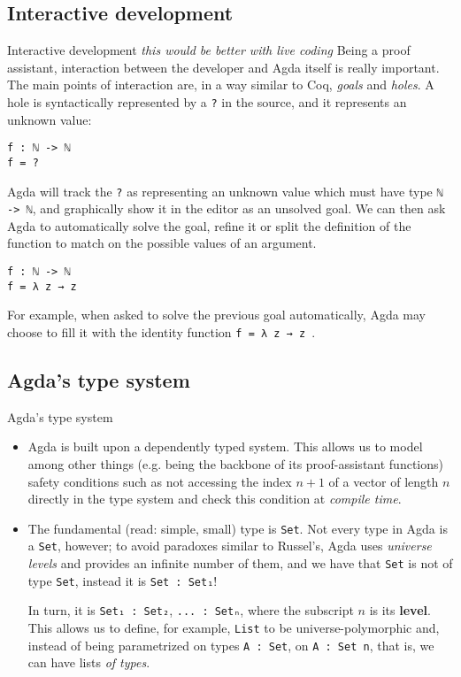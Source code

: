 \documentclass[t,aspectratio=169,9pt]{beamer}
\begin{document}
\subsection[inter-dev]{Interactive development}
\begin{frame}[fragile]{Interactive development}
{\small \it this would be better with live coding}
\vfill
Being a proof assistant, interaction between the developer and Agda itself is
really important. The main points of interaction are, in a way similar to Coq,
\textit{goals} and \textit{holes}. A hole is syntactically represented by a
\texttt{?} in the source, and it represents an unknown value:
\begin{verbatim}
f : ℕ -> ℕ
f = ?
\end{verbatim}
Agda will track the \texttt{?} as representing an unknown value which must have type
\texttt{ℕ -> ℕ}, and graphically show it in the editor as an unsolved
goal. We can then ask Agda to automatically solve the goal, refine it or split
the definition of the function to match on the possible values of an argument.
\begin{verbatim}
f : ℕ -> ℕ
f = λ z → z
\end{verbatim}
For example, when asked to solve the previous goal automatically, Agda may
choose to fill it with the identity function \texttt{f = λ z → z }.
\vfill
\end{frame}
\subsection[types]{Agda's type system}
\begin{frame}[fragile]{Agda's type system}
  \vfill
  \begin{itemize}
  \item {
      Agda is built upon a dependently typed system. This allows us to model
      among other things (e.g. being the backbone of its proof-assistant functions)
      safety conditions such as not accessing the index $n+1$ of a vector of length
      $n$ directly in the type system and check this condition at {\it compile time}.
    }
  \item {
      The fundamental (read: simple, small) type is \texttt{Set}. Not every
      type in Agda is a \texttt{Set}, however; to avoid paradoxes
      similar to Russel's, Agda uses {\it universe levels} and provides an
      infinite number of them, and we have that \texttt{Set} is not of
      type \texttt{Set}, instead it is \texttt{Set : Set₁}!

      In turn, it is \texttt{Set₁ : Set₂}, \texttt{... : Setₙ}, 
      where the subscript $n$ is its {\bf level}. This allows us to define, for
      example, \texttt{List} to be universe-polymorphic and, instead
      of being parametrized on types \texttt{A : Set}, on
      \texttt{A : Set n}, that is, we can have lists {\it of types}.
    }
  \end{itemize}
  \vfill
\end{frame}
\end{document}
